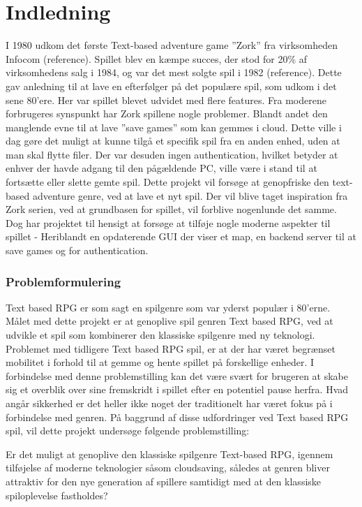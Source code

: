 \newpage

\section{Indledning}
I 1980 udkom det første Text-based adventure game ”Zork” fra virksomheden Infocom (reference). Spillet blev en kæmpe succes, der stod for 20\% af virksomhedens salg i 1984, og var det mest solgte spil i 1982 (reference). Dette gav anledning til at lave en efterfølger på det populære spil, som udkom i det sene 80’ere. Her var spillet blevet udvidet med flere features.
Fra moderene forbrugeres synspunkt har Zork spillene nogle problemer. Blandt andet den manglende evne til at lave ”save games” som kan gemmes i cloud. Dette ville i dag gøre det muligt at kunne tilgå et specifik spil fra en anden enhed, uden at man skal flytte filer. Der var desuden ingen authentication, hvilket betyder at enhver der havde adgang til den pågældende PC, ville være i stand til at fortsætte eller slette gemte spil. 
Dette projekt vil forsøge at genopfriske den text-based adventure genre, ved at lave et nyt spil. Der vil blive taget inspiration fra Zork serien, ved at grundbasen for spillet, vil forblive nogenlunde det samme. Dog har projektet til hensigt at forsøge at tilføje nogle moderne aspekter til spillet - Heriblandt en opdaterende GUI der viser et map, en backend server til at save games og for authentication.


\subsubsection{Problemformulering}
Text based RPG er som sagt en spilgenre som var yderst populær i 80’erne. Målet med dette projekt er at genoplive spil genren Text based RPG, ved at udvikle et spil som kombinerer den klassiske spilgenre med ny teknologi. Problemet med tidligere Text based RPG spil, er at der har været begrænset mobilitet i forhold til at gemme og hente spillet på forskellige enheder. I forbindelse med denne problemstilling kan det være svært for brugeren at skabe sig et overblik over sine fremskridt i spillet efter en potentiel pause herfra. Hvad angår sikkerhed er det heller ikke noget der traditionelt har været fokus på i forbindelse med genren. På baggrund af disse udfordringer ved Text based RPG spil, vil dette projekt undersøge følgende problemstilling:

Er det muligt at genoplive den klassiske spilgenre Text-based RPG, igennem tilføjelse af moderne teknologier såsom cloudsaving, således at genren bliver attraktiv for den nye generation af spillere samtidigt med at den klassiske spiloplevelse fastholdes?
\\




